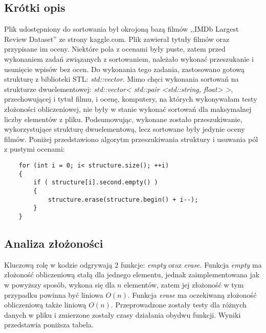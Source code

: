 \subsection{Krótki opis}
Plik udostępniony do sortowania był okrojoną bazą filmów ,,IMDb Largest Review Dataset'' ze strony kaggle.com. Plik zawierał tytuły filmów oraz przypisane im oceny. Niektóre pola z ocenami były puste, zatem przed wykonaniem zadań związanych z sortowaniem, należało wykonać przeszukanie i usunięcie wpisów bez ocen. Do wykonania tego zadania, zastosowano gotową strukturę z biblioteki STL: \textit{std::vector}. Mimo chęci wykonania sortowań na strukturze dwuelementowej: \textit{std::vector< std::pair <std::string, float> >}, przechowującej i tytuł filmu, i ocenę, komputery, na których wykonywałam testy złożoności obliczeniowej, nie były w stanie wykonać sortowań dla maksymalnej liczby elementów z pliku. Podsumowując, wykonane zostało przeszukiwanie, wykorzystujące strukturę dwuelementową, lecz sortowane były jedynie oceny filmów. Poniżej przedstawiono algorytm przeszukiwania struktury i usuwania pól z pustymi ocenami:

\begin{lstlisting}
    for (int i = 0; i< structure.size(); ++i)
    {
        if ( structure[i].second.empty() )    
        {
            structure.erase(structure.begin() + i--);
        }
    }
\end{lstlisting}

\subsection{Analiza złożoności}
Kluczową rolę w kodzie odgrywają 2 funkcje: \textit{empty} oraz \textit{erase}. Funkcja \textit{empty} ma złożoność obliczeniową stałą dla jednego elementu, jednak zaimplementowana jak w powyższy sposób, wykona się dla $n$ elementów, zatem jej złożoność w tym przypadku powinna być liniowa $O(n)$. Funkcja \textit{erase} ma oczekiwaną złożoność obliczeniową także liniową $O(n)$. Przeprowadzone zostały testy dla różnych danych w pliku i zmierzone zostały czasy działania obydwu funkcji. Wyniki przedstawia poniższa tabela.

